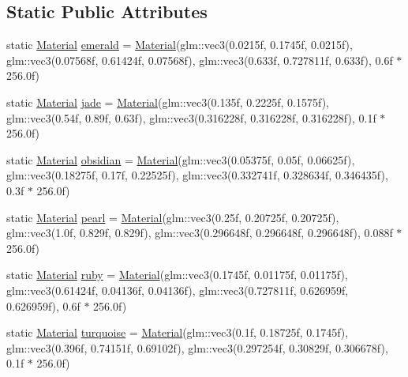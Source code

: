 \subsection*{Static Public Attributes}
\begin{DoxyCompactItemize}
\item 
static \mbox{\hyperlink{struct_material}{Material}} \mbox{\hyperlink{struct_material_ad6a424d01ca060a25ce520c4dc5b00c2}{emerald}} = \mbox{\hyperlink{struct_material}{Material}}(glm\+::vec3(0.\+0215f, 0.\+1745f, 0.\+0215f), glm\+::vec3(0.\+07568f, 0.\+61424f, 0.\+07568f), glm\+::vec3(0.\+633f, 0.\+727811f, 0.\+633f), 0.\+6f $\ast$ 256.\+0f)
\item 
static \mbox{\hyperlink{struct_material}{Material}} \mbox{\hyperlink{struct_material_ab321b1fd760849c28860768bc08c3719}{jade}} = \mbox{\hyperlink{struct_material}{Material}}(glm\+::vec3(0.\+135f, 0.\+2225f, 0.\+1575f), glm\+::vec3(0.\+54f, 0.\+89f, 0.\+63f), glm\+::vec3(0.\+316228f, 0.\+316228f, 0.\+316228f), 0.\+1f $\ast$ 256.\+0f)
\item 
static \mbox{\hyperlink{struct_material}{Material}} \mbox{\hyperlink{struct_material_aa189bbbd916aaf6a451296e2ffc6a47c}{obsidian}} = \mbox{\hyperlink{struct_material}{Material}}(glm\+::vec3(0.\+05375f, 0.\+05f, 0.\+06625f), glm\+::vec3(0.\+18275f, 0.\+17f, 0.\+22525f), glm\+::vec3(0.\+332741f, 0.\+328634f, 0.\+346435f), 0.\+3f $\ast$ 256.\+0f)
\item 
static \mbox{\hyperlink{struct_material}{Material}} \mbox{\hyperlink{struct_material_af1eb6afe67d69a7992ac7bfd31c76173}{pearl}} = \mbox{\hyperlink{struct_material}{Material}}(glm\+::vec3(0.\+25f, 0.\+20725f, 0.\+20725f), glm\+::vec3(1.\+0f, 0.\+829f, 0.\+829f), glm\+::vec3(0.\+296648f, 0.\+296648f, 0.\+296648f), 0.\+088f $\ast$ 256.\+0f)
\item 
static \mbox{\hyperlink{struct_material}{Material}} \mbox{\hyperlink{struct_material_ae269e4b2375a840f121a2560a9d2b05b}{ruby}} = \mbox{\hyperlink{struct_material}{Material}}(glm\+::vec3(0.\+1745f, 0.\+01175f, 0.\+01175f), glm\+::vec3(0.\+61424f, 0.\+04136f, 0.\+04136f), glm\+::vec3(0.\+727811f, 0.\+626959f, 0.\+626959f), 0.\+6f $\ast$ 256.\+0f)
\item 
static \mbox{\hyperlink{struct_material}{Material}} \mbox{\hyperlink{struct_material_aa0d30b652e32ae61aa50cedf8ed38656}{turquoise}} = \mbox{\hyperlink{struct_material}{Material}}(glm\+::vec3(0.\+1f, 0.\+18725f, 0.\+1745f), glm\+::vec3(0.\+396f, 0.\+74151f, 0.\+69102f), glm\+::vec3(0.\+297254f, 0.\+30829f, 0.\+306678f), 0.\+1f $\ast$ 256.\+0f)

\end{DoxyCompactItemize}
